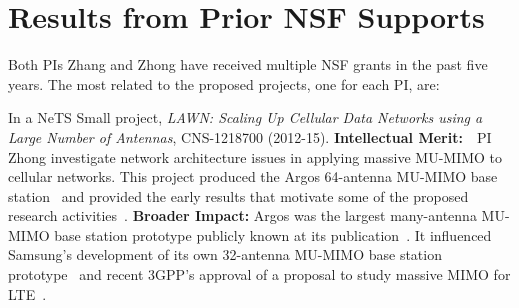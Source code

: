 \section{Results from Prior NSF Supports\label{sec:prior}}

Both PIs Zhang and Zhong have received multiple NSF grants in the past five years. The most related to the proposed projects, one for each PI, are: 



In a NeTS Small project, \emph{LAWN: Scaling Up Cellular Data Networks
  using a Large Number of Antennas}, CNS-1218700 (2012-15). {\bf Intellectual Merit:}~~PI Zhong
investigate
network architecture issues in applying massive MU-MIMO to cellular
networks. This project produced the Argos 64-antenna MU-MIMO base station~\cite{shepard2012mobicom} and provided the early
results that motivate some of the proposed research activities~\cite{shepard2013cellnet}. {\bf Broader Impact:} Argos was the largest many-antenna MU-MIMO base station prototype publicly known at its publication~\cite{shepard2012mobicom}. It influenced Samsung's development of its own 32-antenna MU-MIMO base station prototype~\cite{samsung2013fdmimo} and recent 3GPP's approval of a proposal to study massive MIMO for LTE~\cite{fdmimo}. %